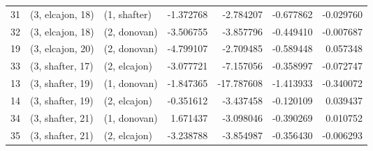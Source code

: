 \begin{tabular}{lllrrrr}
31 &  (3, elcajon, 18) &     (1, shafter) &  -1.372768 &  -2.784207 &  -0.677862 & -0.029760 \\
32 &  (3, elcajon, 18) &     (2, donovan) &  -3.506755 &  -3.857796 &  -0.449410 & -0.007687 \\
19 &  (3, elcajon, 20) &     (2, donovan) &  -4.799107 &  -2.709485 &  -0.589448 &  0.057348 \\
33 &  (3, shafter, 17) &     (2, elcajon) &  -3.077721 &  -7.157056 &  -0.358997 & -0.072747 \\
13 &  (3, shafter, 19) &     (1, donovan) &  -1.847365 & -17.787608 &  -1.413933 & -0.340072 \\
14 &  (3, shafter, 19) &     (2, elcajon) &  -0.351612 &  -3.437458 &  -0.120109 &  0.039437 \\
34 &  (3, shafter, 21) &     (1, donovan) &   1.671437 &  -3.098046 &  -0.390269 &  0.010752 \\
35 &  (3, shafter, 21) &     (2, elcajon) &  -3.238788 &  -3.854987 &  -0.356430 & -0.006293 \\
\bottomrule
\end{tabular}
